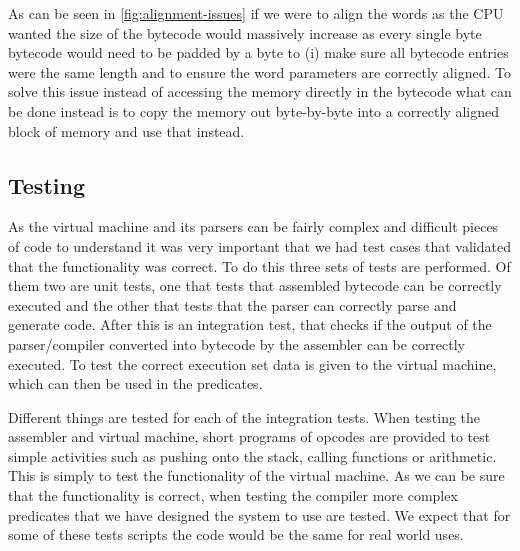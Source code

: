 As can be seen in \autoref{fig:alignment-issues} if we were to align the words as the CPU wanted the size of the bytecode would massively increase as every single byte bytecode would need to be padded by a byte to (i) make sure all bytecode entries were the same length and to ensure the word parameters are correctly aligned. To solve this issue instead of accessing the memory directly in the bytecode what can be done instead is to copy the memory out byte-by-byte into a correctly aligned block of memory and use that instead.

\subsection{Testing}

As the virtual machine and its parsers can be fairly complex and difficult pieces of code to understand it was very important that we had test cases that validated that the functionality was correct. To do this three sets of tests are performed. Of them two are unit tests, one that tests that assembled bytecode can be correctly executed and the other that tests that the parser can correctly parse and generate code. After this is an integration test, that checks if the output of the parser/compiler converted into bytecode by the assembler can be correctly executed. To test the correct execution set data is given to the virtual machine, which can then be used in the predicates.

Different things are tested for each of the integration tests. When testing the assembler and virtual machine, short programs of opcodes are provided to test simple activities such as pushing onto the stack, calling functions or arithmetic. This is simply to test the functionality of the virtual machine. As we can be sure that the functionality is correct, when testing the compiler more complex predicates that we have designed the system to use are tested. We expect that for some of these tests scripts the code would be the same for real world uses.
